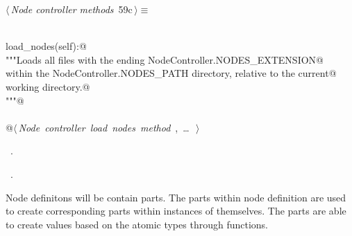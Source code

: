 \documentclass[
    a4paper,      %
    10pt,         %
    openright,    %
    notitlepage,  %
    parskip=half, %
]{scrreprt}       %
\theoremstyle{definition}                    %
\begin{document}
\begin{flushleft} \small
\begin{minipage}{\linewidth}\label{scrap99}\raggedright\small
{} $\langle\,${\itshape Node controller methods}\nobreak\ {\footnotesize {59c}}$\,\rangle\equiv$
\vspace{-1exm}
\begin{list}{}{} \item
\mbox{}\lstinline@@\\
\mbox{}\lstinline@def load_nodes(self):@\\
\mbox{}\lstinline@    """Loads all files with the ending NodeController.NODES_EXTENSION@\\
\mbox{}\lstinline@    within the NodeController.NODES_PATH directory, relative to the current@\\
\mbox{}\lstinline@    working directory.@\\
\mbox{}\lstinline@    """@\\
\mbox{}\lstinline@@\\
\mbox{}\lstinline@    @\hbox{$\langle\,${\itshape Node controller load nodes method}\nobreak\ {\footnotesize {}, \ldots\ }$\,\rangle$}\lstinline@@{\NWsep}
\end{list}
\vspace{-1.5ex}
\footnotesize
\begin{list}{}{\setlength{\itemsep}{-\parsep}\setlength{\itemindent}{-\leftmargin}}
\item \NWtxtMacroDefBy\ .
\item \NWtxtMacroRefIn\ .

\item{}
\end{list}
\end{minipage}\vspace{4ex}
\end{flushleft}
Node definitons will be contain parts. The parts within node definition are
used to create corresponding parts within instances of themselves. The parts
are able to create values based on the atomic types through functions.
\end{document}
